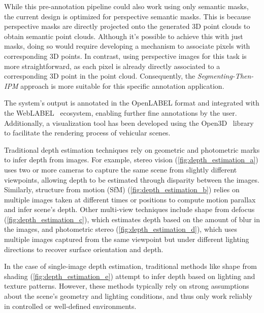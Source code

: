 While this pre-annotation pipeline could also work using only  semantic masks, the current design is optimized for perspective semantic masks. This is because perspective masks are directly projected onto the generated 3D point clouds to obtain semantic point clouds. Although it's possible to achieve this with just  masks, doing so would require developing a mechanism to associate  pixels with corresponding 3D points. In contrast, using perspective images for this task is more straightforward, as each pixel is already directly associated to a corresponding 3D point in the point cloud. Consequently, the \textit{Segmenting-Then-IPM} approach is more suitable for this specific annotation application.

The system's output is annotated in the OpenLABEL format and integrated with the WebLABEL~\cite{weblabel} ecosystem, enabling further fine annotations by the user. Additionally, a visualization tool has been developed using the Open3D~\cite{open3d} library to facilitate the rendering process of vehicular scenes.

\label{sec:depth_estimation}

Traditional depth estimation techniques \cite{computer_vision_depth_estimation} rely on geometric and photometric marks to infer depth from images. For example, stereo vision (\ref{fig:depth_estimation_a}) uses two or more cameras to capture the same scene from slightly different viewpoints, allowing depth to be estimated through disparity between the images. Similarly, structure from motion (SfM) (\ref{fig:depth_estimation_b}) relies on multiple images taken at different times or positions to compute motion parallax and infer scene's depth. Other multi-view techniques include shape from defocus (\ref{fig:depth_estimation_c}), which estimates depth based on the amount of blur in the images, and photometric stereo (\ref{fig:depth_estimation_d}), which uses multiple images captured from the same viewpoint but under different lighting directions to recover surface orientation and depth.

In the case of single-image depth estimation, traditional methods like shape from shading (\ref{fig:depth_estimation_e}) attempt to infer depth based on lighting and texture patterns. However, these methods typically rely on strong assumptions about the scene's geometry and lighting conditions, and thus only work reliably in controlled or well-defined environments.

